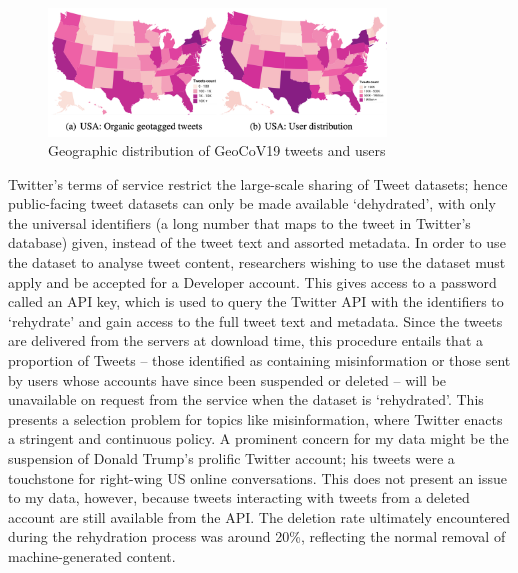 \documentclass{article}
\begin{document}
\begin{figure}[h!]
    \includegraphics[width=0.8\textwidth]{figs/GeoCov-USdist.png}    
    \centering
    \caption{Geographic distribution of GeoCoV19 tweets and users \parencite{qaziGeoCoV19DatasetHundreds2020a}}
\end{figure}

Twitter's terms of service restrict the large-scale sharing of Tweet datasets; hence public-facing tweet datasets can only be made available `dehydrated', with only the universal identifiers (a long number that maps to the tweet in Twitter's database) given, instead of the tweet text and assorted metadata. In order to use the dataset to analyse tweet content, researchers wishing to use the dataset must apply and be accepted for a Developer account. This gives access to a password called an API key, which is used to query the Twitter API with the identifiers to `rehydrate' and gain access to the full tweet text and metadata. Since the tweets are delivered from the servers at download time, this procedure entails that a proportion of Tweets -- those identified as containing misinformation or those sent by users whose accounts have since been suspended or deleted -- will be unavailable on request from the service when the dataset is `rehydrated'. This presents a selection problem for topics like misinformation, where Twitter enacts a stringent and continuous policy. A prominent concern for my data might be the suspension of Donald Trump's prolific Twitter account; his tweets were a touchstone for right-wing US online conversations. This does not present an issue to my data, however, because tweets interacting with tweets from a deleted account are still available from the API. The deletion rate ultimately encountered during the rehydration process was around 20\%, reflecting the normal removal of machine-generated content.
\end{document}

